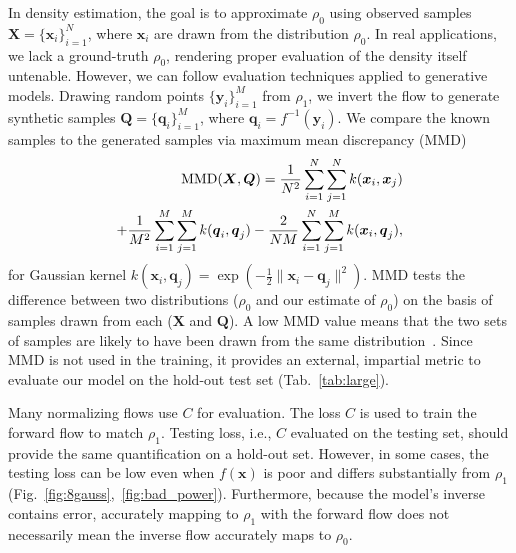 \documentclass[letterpaper]{article}
\newcommand{\bfq}{\boldsymbol{q}}
\newcommand{\bfx}{\boldsymbol{x}}
\newcommand{\bfy}{\boldsymbol{y}}
\newcommand{\bfQ}{\boldsymbol{Q}}
\newcommand{\bfX}{\boldsymbol{X}}
\begin{document}
	In density estimation, the goal is to approximate $\rho_0$ using observed samples $\bfX=\{ \bfx_i \}_{i=1}^N$, where $\bfx_i$ are drawn from the distribution $\rho_0$.
	In real applications, we lack a ground-truth $\rho_0$, rendering proper evaluation of the density itself untenable. However, we can follow evaluation techniques applied to generative models. Drawing random points $\{ \bfy_i \}_{i=1}^M$ from $\rho_1$, we invert the flow to generate synthetic samples $\bfQ=\{ \bfq_i \}_{i=1}^M$, where $\bfq_i = f^{-1}(\bfy_i)$. We compare the known samples to the generated samples via maximum mean discrepancy (MMD)~\cite{gretton2012mmd,li2015generative,theis2016mmd,peyre2018computational}%
	\begin{equation}%
	\begin{split}%
	  	{\rm MMD}(\bfX,\bfQ) = \frac{1}{N^2} \sum_{i=1}^N \sum_{j=1}^N k(\bfx_i,\bfx_j) \\
				   + \frac{1}{M^2} \sum_{i=1}^M \sum_{j=1}^M k(\bfq_i,\bfq_j)
				   - \frac{2}{NM}  \sum_{i=1}^N \sum_{j=1}^M k(\bfx_i,\bfq_j) ,
	\end{split}%
	\end{equation}%
	for Gaussian kernel $k(\bfx_i,\bfq_j)= \exp( - \frac{1}{2} \| \bfx_i - \bfq_j \|^2)$. MMD tests the difference between two distributions ($\rho_0$ and our estimate of $\rho_0$) on the basis of samples drawn from each ($\bfX$ and $\bfQ$). A low MMD value means that the two sets of samples are likely to have been drawn from the same distribution~\cite{gretton2012mmd}. Since MMD is not used in the training, it provides an external, impartial metric to evaluate our model on the hold-out test set (Tab.~\ref{tab:large}).
	
	Many normalizing flows use $C$ for evaluation. The loss $C$ is used to train the forward flow to match $\rho_1$. Testing loss, i.e., $C$ evaluated on the testing set, should provide the same quantification on a hold-out set.
	However, in some cases, the testing loss can be low even when $f(\bfx)$ is poor and differs substantially from $\rho_1$ (Fig.~\ref{fig:8gauss},~\ref{fig:bad_power}).
	Furthermore, because the model's inverse contains error, accurately mapping to $\rho_1$ with the forward flow does not necessarily mean the inverse flow accurately maps to $\rho_0$.
\end{document}
